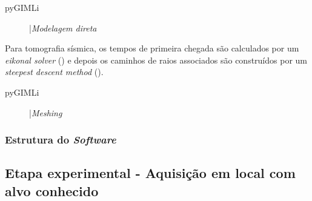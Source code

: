 \documentclass[a4paper, 12 pt]{article} %
\begin{document}
\begin{description}
	\item[pyGIMLi] |\textit{Modelagem direta} 
\end{description}

Para tomografia sísmica, os tempos de primeira chegada são calculados por um \textit{eikonal solver} (\citealp{podvin1991finite}) e depois os caminhos de raios associados são construídos por um \textit{steepest descent method} (\citealp{aldridge1993two}).

\begin{description}
	\item[pyGIMLi] |\textit{Meshing} 
\end{description}




\subsubsection{Estrutura do \emph{Software}}

\blindtext 
%
\blindtext 
%
\blindtext


\subsection{Etapa experimental - Aquisição em local com alvo conhecido}

\blindtext 
%
\blindtext 
%
\blindtext

\end{document}
